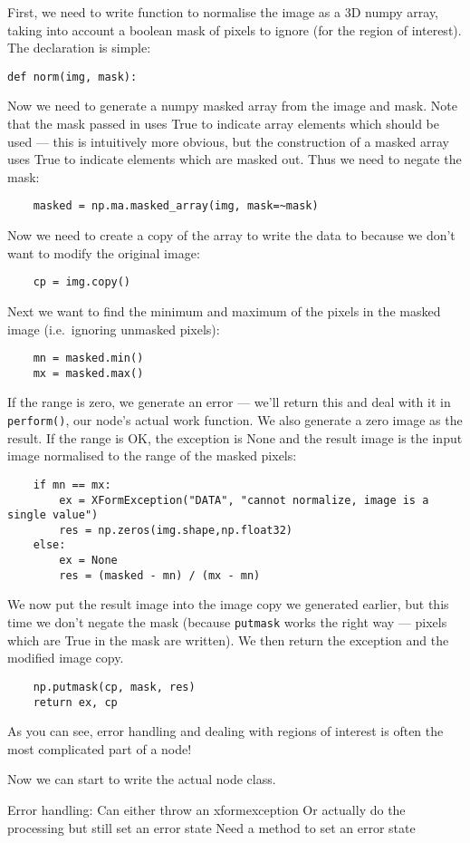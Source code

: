 First, we need to write function to normalise the image as a 3D numpy array,
taking into account a boolean mask of pixels to ignore (for the region
of interest). The declaration is simple:
\begin{lstlisting}
def norm(img, mask):
\end{lstlisting}
Now we need to generate a numpy masked array from the image and mask.
Note that the mask passed in uses True to indicate array elements which should
be used --- this is intuitively more obvious, but the construction
of a masked array uses True to indicate elements which are masked out. Thus
we need to negate the mask:
\begin{lstlisting}
    masked = np.ma.masked_array(img, mask=~mask)
\end{lstlisting}
Now we need to create a copy of the array to write the data to because we
don't want to modify the original image:
\begin{lstlisting}
    cp = img.copy()
\end{lstlisting}
Next we want to find the minimum and maximum of the pixels in the masked
image (i.e.\ ignoring unmasked pixels):
\begin{lstlisting}
    mn = masked.min()
    mx = masked.max()
\end{lstlisting}
If the range is zero, we generate an error --- we'll return this and deal
with it in \texttt{perform()}, our node's actual work function. We also
generate a zero image as the result.
If the range is OK, the exception is None and the result image is
the input image normalised
to the range of the masked pixels:
\begin{lstlisting}
    if mn == mx:
        ex = XFormException("DATA", "cannot normalize, image is a single value")
        res = np.zeros(img.shape,np.float32)
    else:
        ex = None
        res = (masked - mn) / (mx - mn)
\end{lstlisting}
We now put the result image into the image copy we generated earlier,
but this time we don't negate the mask (because \texttt{putmask} works
the right way --- pixels which are True in the mask are written). We 
then return the exception and the modified image copy.
\begin{lstlisting}
    np.putmask(cp, mask, res)
    return ex, cp
\end{lstlisting}
As you can see, error handling and dealing with regions of interest
is often the most complicated part of a node!

Now we can start to write the actual node class.



Error handling:
    Can either throw an xformexception
    Or actually do the processing but still set an error state
    Need a method to set an error state
    
